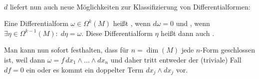 \documentclass[../H_Analysis_main.tex]{subfiles}
\begin{document}
	\\


$d$ liefert nun auch neue Möglichkeiten zur Klassifizierung von Differentialformen:
\begin{defi}
Eine Differentialform $\omega \in \Omega^k(M)$ heißt , wenn $d\omega = 0$ und , wenn $\exists \eta \in \Omega^{k - 1}(M): \; d\eta = \omega$. Diese Differentialform $\eta$ heißt dann auch .
\end{defi}
Man kann nun sofort festhalten, dass für $n = \dim(M)$ jede $n$-Form geschlossen ist, weil dann $\omega = f \, dx_1 \wedge \dots \wedge dx_n$ und daher tritt entweder der (triviale) Fall $df = 0$ ein oder es kommt ein doppelter Term $dx_j \wedge dx_j$ vor.\\
\end{document}
